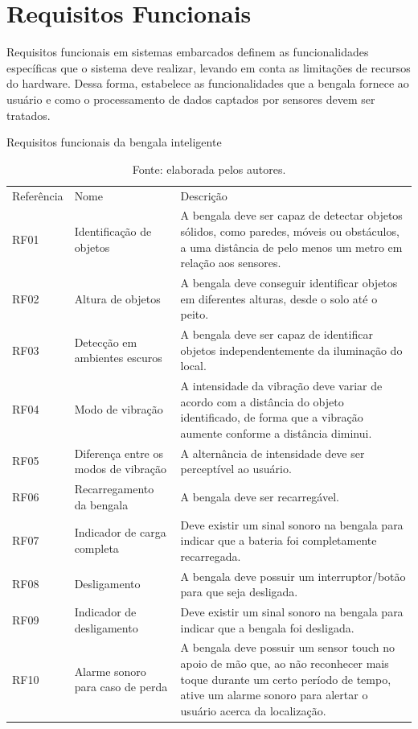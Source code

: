 \section{Requisitos Funcionais}
    Requisitos funcionais em sistemas embarcados definem as funcionalidades específicas que o sistema deve realizar, levando em conta as limitações de recursos do hardware. Dessa forma, estabelece as funcionalidades que a bengala fornece ao usuário e como o processamento de dados captados por sensores devem ser tratados.


\begin{table}[!ht]    
    \captionsetup{width=1.0\textwidth} %
    \caption{Requisitos funcionais da bengala inteligente}  
    \renewcommand{\arraystretch}{1.5} %
    \begin{tabular}{p{}p{}p{}} %
        \toprule
        Referência & Nome & Descrição \\
        RF01 & Identificação de objetos & A bengala deve ser capaz de detectar objetos sólidos, como paredes, móveis ou obstáculos, a uma distância de pelo menos um metro em relação aos sensores.   \\
        RF02 & Altura de objetos  & A bengala deve conseguir identificar objetos em diferentes alturas, desde o solo até o peito. \\
        RF03 & Detecção em ambientes escuros  &  A bengala deve ser capaz de identificar objetos independentemente da iluminação do local.  \\
        RF04 & Modo de vibração  &  A intensidade da vibração deve variar de acordo com a distância do objeto identificado, de forma que a vibração aumente conforme a distância diminui.  \\
        RF05 & Diferença entre os modos de vibração  & A alternância de intensidade deve ser perceptível ao usuário. \\
        RF06 & Recarregamento da bengala  & A bengala deve ser recarregável.  \\
        RF07 & Indicador de carga completa  &  Deve existir um sinal sonoro na bengala para indicar que a bateria foi completamente recarregada.  \\
        RF08 & Desligamento  & A bengala deve possuir um interruptor/botão para que seja desligada. \\
        RF09 & Indicador de desligamento  &  Deve existir um sinal sonoro na bengala para indicar que a bengala foi desligada.  \\
        RF10 & Alarme sonoro para caso de perda  &  A bengala deve possuir um sensor touch no apoio de mão que, ao não reconhecer mais toque durante um certo período de tempo, ative um alarme sonoro para alertar o usuário acerca da localização.  \\
        \bottomrule
    \end{tabular}
    \caption*{Fonte: elaborada pelos autores.} %
\end{table}


